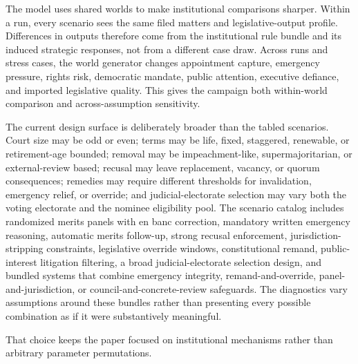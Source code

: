 \documentclass[
    journal=jlc,
    manuscript=research-article,
    year=2026,
  ]{cup-journal}
\begin{document}
The model uses shared worlds to make institutional comparisons sharper. Within a run, every scenario sees the same filed matters and legislative-output profile. Differences in outputs therefore come from the institutional rule bundle and its induced strategic responses, not from a different case draw. Across runs and stress cases, the world generator changes appointment capture, emergency pressure, rights risk, democratic mandate, public attention, executive defiance, and imported legislative quality. This gives the campaign both within-world comparison and across-assumption sensitivity.

The current design surface is deliberately broader than the tabled scenarios. Court size may be odd or even; terms may be life, fixed, staggered, renewable, or retirement-age bounded; removal may be impeachment-like, supermajoritarian, or external-review based; recusal may leave replacement, vacancy, or quorum consequences; remedies may require different thresholds for invalidation, emergency relief, or override; and judicial-electorate selection may vary both the voting electorate and the nominee eligibility pool. The scenario catalog includes randomized merits panels with en banc correction, mandatory written emergency reasoning, automatic merits follow-up, strong recusal enforcement, jurisdiction-stripping constraints, legislative override windows, constitutional remand, public-interest litigation filtering, a broad judicial-electorate selection design, and bundled systems that combine emergency integrity, remand-and-override, panel-and-jurisdiction, or council-and-concrete-review safeguards. The diagnostics vary assumptions around these bundles rather than presenting every possible combination as if it were substantively meaningful.

That choice keeps the paper focused on institutional mechanisms rather than arbitrary parameter permutations.
\end{document}
